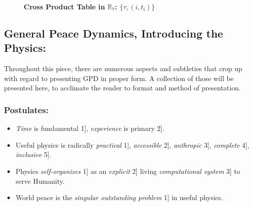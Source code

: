 \documentclass{article}
\begin{document}
\begin{figure}[htbp]
\newlength{\tableheightdiffA}
\setlength{\tableheightdiffA}{\ht\lefttableboxA}
\addtolength{\tableheightdiffA}{-\ht\righttableboxA}
\addtolength{\tableheightdiffA}{-1.5cm}    
\begin{minipage}[t]{0.48\textwidth}
\usebox{\lefttableboxA}
\caption*{{\small\bf Cross Product Table in $\mathbb{R}_7$: $\{\tau, (i, t_i)\}$ }}
\end{minipage}     
\end{figure}



\subsection*{General Peace Dynamics, Introducing the Physics:}

\noindent Throughout this piece, there are numerous aspects and subtleties that crop up with regard to presenting GPD in proper form. A collection of those will be presented here, to acclimate the reader to format and method of presentation.

\subsubsection*{Postulates:}
\begin{itemize}
\item[. [P1.] {\em Time} is fundamental 1], {\em experience} is primary 2].
\item[. [P2.] Useful physics is radically {\em practical} 1], {\em accessible} 2], {\em anthropic} 3], {\em complete} 4], {\em inclusive} 5].
\item[. [P3.] Physics {\em self-organizes} 1] as an {\em explicit} 2] living {\em computational system} 3] to serve Humanity.
\item[. [P4.] World peace is the {\em singular outstanding problem} 1] in useful physics.
\end{itemize}
\end{document}
